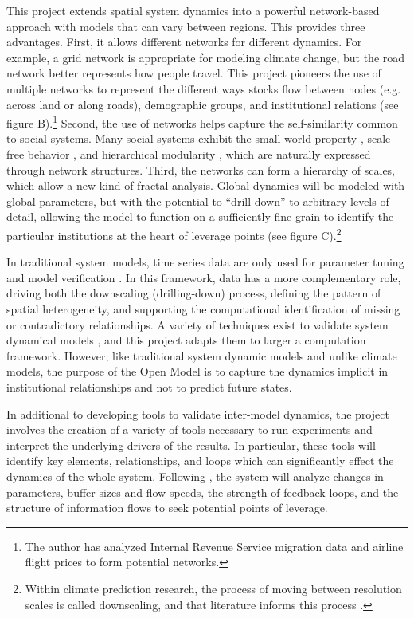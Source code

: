 \documentclass[12pt, oneside]{amsart}
\begin{document}
This project extends spatial system dynamics into a powerful network-based approach with models that can vary between regions.  This provides three advantages.  First, it allows different networks for different dynamics.  For example, a grid network is appropriate for modeling climate change, but the road network better represents how people travel.  This project pioneers the use of multiple networks to represent the different ways stocks flow between nodes (e.g. across land or along roads), demographic groups, and institutional relations (see figure B).\footnote{The author has analyzed Internal Revenue Service migration data and airline flight prices to form potential networks.}  Second, the use of networks helps capture the self-similarity common to social systems.  Many social systems exhibit the small-world property \citep{watts1998collective}, scale-free behavior \citep{barabasi1999emergence}, and hierarchical modularity \citep{ravasz2002hierarchical}, which are naturally expressed through network structures.  Third, the networks can form a hierarchy of scales, which allow a new kind of fractal analysis.  Global dynamics will be modeled with global parameters, but with the potential to ``drill down'' to arbitrary levels of detail, allowing the model to function on a sufficiently fine-grain to identify the particular institutions at the heart of leverage points (see figure C).\footnote{Within climate prediction research, the process of moving between resolution scales is called downscaling, and that literature informs this process \citep{murphy1999evaluation}.}

In traditional system models, time series data are only used for parameter tuning and model verification \citep{Forrester1991}.  In this framework, data has a more complementary role, driving both the downscaling (drilling-down) process, defining the pattern of spatial heterogeneity, and supporting the computational identification of missing or contradictory relationships.  A variety of techniques exist to validate system dynamical models \citep{barlas1996formal, graham1976parameter}, and this project adapts them to larger a computation framework.  However, like traditional system dynamic models and unlike climate models, the purpose of the Open Model is to capture the dynamics implicit in institutional relationships and not to predict future states.

In additional to developing tools to validate inter-model dynamics, the project involves the creation of a variety of tools necessary to run experiments and interpret the underlying drivers of the results.  In particular, these tools will identify key elements, relationships, and loops which can significantly effect the dynamics of the whole system.  Following \cite{meadows1997places}, the system will analyze changes in parameters, buffer sizes and flow speeds, the strength of feedback loops, and the structure of information flows to seek potential points of leverage.
\end{document}
